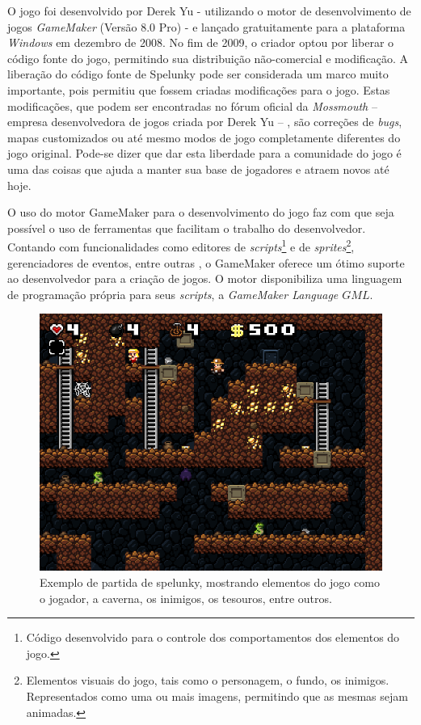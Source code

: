 O jogo foi desenvolvido por Derek Yu - utilizando o motor de desenvolvimento de
jogos \textit{GameMaker} (Versão 8.0 Pro) - e lançado gratuitamente para a
plataforma \textit{Windows} em dezembro de 2008\cite{SPELUNKYRELEASE}. No fim de
2009, o criador optou por liberar o código fonte do jogo, permitindo sua
distribuição não-comercial e modificação\cite{SPELUNKYLICENSE}. A liberação do
código fonte de Spelunky pode ser considerada um marco muito importante, pois
permitiu que fossem criadas modificações para o jogo. Estas modificações, que
podem ser encontradas no fórum oficial da \textit{Mossmouth} -- empresa
desenvolvedora de jogos criada por Derek Yu -- \cite{SPELUNKYFORUM}, são
correções de \textit{bugs}, mapas customizados ou até mesmo modos de jogo
completamente diferentes do jogo original. Pode-se dizer que dar esta liberdade
para a comunidade do jogo é uma das coisas que ajuda a manter sua base de
jogadores e atraem novos até hoje.

O uso do motor GameMaker para o desenvolvimento do jogo faz com que seja
possível o uso de ferramentas que facilitam o trabalho do desenvolvedor.
Contando com funcionalidades como editores de \textit{scripts}\footnote{Código
desenvolvido para o controle dos comportamentos dos elementos do jogo.} e de
\textit{sprites}\footnote{Elementos visuais do jogo, tais como o personagem, o
fundo, os inimigos. Representados como uma ou mais imagens, permitindo que as
mesmas sejam animadas.}, gerenciadores de eventos, entre outras
\cite{GMAKER8DOCS}, o GameMaker oferece um ótimo suporte ao desenvolvedor para a
criação de jogos. O motor disponibiliza uma linguagem de programação própria
para seus \textit{scripts}, a \textit{GameMaker Language \(GML\)}.

\begin{figure}[htb!]
\centering\includegraphics[width=.65\textwidth]{fig/spelunky-pc-screen.png}
\caption {\label{fig:spelunky-gameplay}Exemplo de partida de spelunky, mostrando
elementos do jogo como o jogador, a caverna, os inimigos, os tesouros, entre
outros.} \end{figure}


